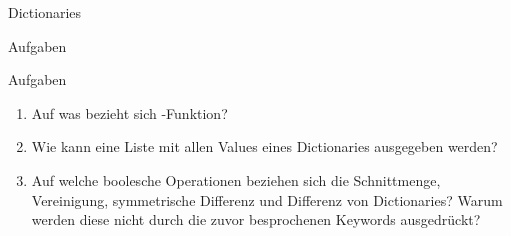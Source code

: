 \begin{subsection}{Dictionaries}
\begin{subsubsection}{Aufgaben}
\begin{frame}{Aufgaben}
\begin{enumerate}
                    \item Auf was bezieht sich -Funktion?
                    
                    \item Wie kann eine Liste mit allen Values eines Dictionaries ausgegeben werden?
                    
                    \item Auf welche boolesche Operationen beziehen sich die Schnittmenge, Vereinigung, symmetrische Differenz und Differenz von Dictionaries? Warum werden diese nicht durch die zuvor besprochenen Keywords ausgedrückt?

                \end{enumerate}
            \end{frame}
        \end{subsubsection}
    \end{subsection}
    
